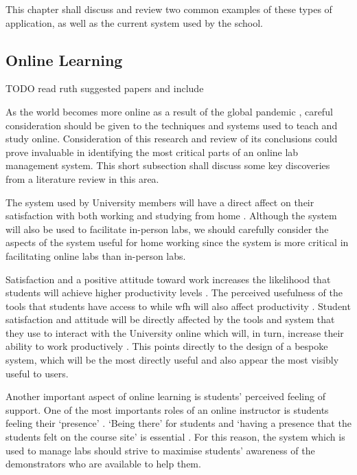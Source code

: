 This chapter shall discuss and review two common examples of these types of application, as well as the current system used by the school.

\subsection{Online Learning}

TODO read ruth suggested papers and include

As the world becomes more online as a result of the global pandemic \cite{bbcinternet} \cite{ofcominternet}, careful consideration should be given to the techniques and systems used to teach and study online. Consideration of this research and review of its conclusions could prove invaluable in identifying the most critical parts of an online lab management system. This short subsection shall discuss some key discoveries from a literature review in this area.

The system used by University members will have a direct affect on their satisfaction with both working and studying from home \cite{tenney}. Although the system will also be used to facilitate in-person labs, we should carefully consider the aspects of the system useful for home working since the system is more critical in facilitating online labs than in-person labs. 

Satisfaction and a positive attitude toward work increases the likelihood that students will achieve higher productivity levels \cite{tenney}. The perceived usefulness of the tools that students have access to while \gls{wfh} will also affect productivity \cite{venka}. Student satisfaction and attitude will be directly affected by the tools and system that they use to interact with the University online which will, in turn, increase their ability to work productively \cite{safaa}. This points directly to the design of a bespoke system, which will be the most directly useful and also appear the most visibly useful to users.

Another important aspect of online learning is students' perceived feeling of support. One of the most importants roles of an online instructor is students feeling their `presence’ \cite{martinteams}. `Being there’ for students and `having a presence that the students felt on the course site’ is essential \cite{martin}. For this reason, the system which is used to manage labs should strive to maximise students' awareness of the demonstrators who are available to help them. 

